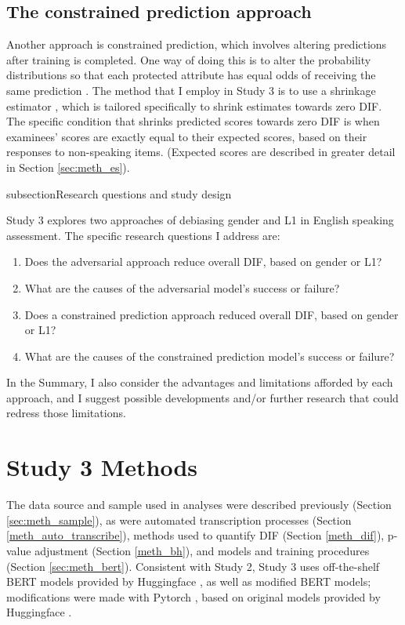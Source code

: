 \documentclass [PhD] {uclathes}
\begin{document}
\subsection{The constrained prediction approach}

Another approach is constrained prediction, which involves altering predictions after training is completed. One way of doing this is to alter the probability distributions so that each protected attribute has equal odds of receiving the same prediction \citep[e.g.][]{yatskar2016situation}. The method that I employ in Study 3 is to use a shrinkage estimator \citep{fourdrinier2018shrinkage}, which is tailored specifically to shrink estimates towards zero DIF. The specific condition that shrinks predicted scores towards zero DIF is when examinees’ scores are exactly equal to their expected scores, based on their responses to non-speaking items. (Expected scores are described in greater detail in Section \ref{sec:meth_es}).

subsection{Research questions and study design}

Study 3 explores two approaches of debiasing gender and L1 in English speaking assessment. The specific research questions I address are:

\begin{enumerate}
	\item Does the adversarial approach reduce overall DIF, based on gender or L1?
	\item What are the causes of the adversarial model’s success or failure?
	\item Does a constrained prediction approach reduced overall DIF, based on gender or L1?
	\item What are the causes of the constrained prediction model’s success or failure?
\end{enumerate}

In the Summary, I also consider the advantages and limitations afforded by each approach, and I suggest possible developments and/or further research that could redress those limitations. 

\section{Study 3 Methods}

The data source and sample used in analyses were described previously (Section \ref{sec:meth_sample}), as were automated transcription processes (Section \ref{meth_auto_transcribe}), methods used to quantify DIF (Section \ref{meth_dif}), p-value adjustment (Section \ref{meth_bh}), and models and training procedures (Section \ref{sec:meth_bert}). Consistent with Study 2, Study 3 uses off-the-shelf BERT models provided by Huggingface \citep{wolf_transformers_2020}, as well as modified BERT models; modifications were made with Pytorch \citep{paszke_pytorch_2019}, based on original models provided by Huggingface \citep{wolf_transformers_2020}.
\end{document}
